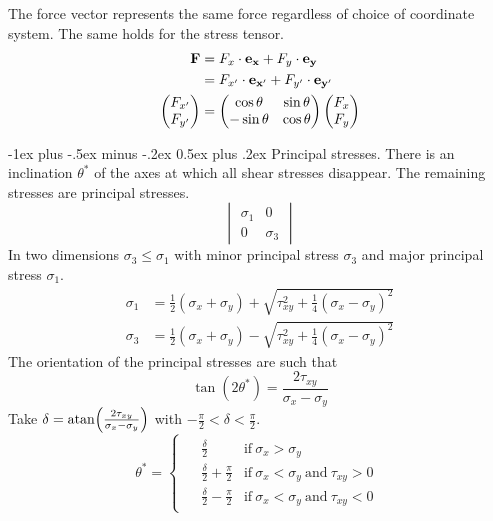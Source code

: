 \documentclass[10pt,landscape,a4paper]{article}
\makeatletter
\renewcommand{\section}{\@startsection{section}{1}{0mm}%
	{-1ex plus -.5ex minus -.2ex}%
	{0.5ex plus .2ex}%
	{\normalfont\large\bfseries}}
\makeatother
\begin{document}
\begin{multicols}{3}
\begin{figure}[H]
	\end{figure}
	The force vector represents the same force regardless of choice of coordinate system. The same holds for the stress tensor.
	\begin{align*}
		\vb{F}                                     & =F_x\cdot\vb{e}_{\vb{x}}+F_y\cdot\vb{e}_{\vb{y}}                                                                 \\
		                                           & =F_{x'}\cdot\vb{e}_{\vb{x'}}+F_{y'}\cdot\vb{e}_{\vb{y'}}                                                         \\
		\begin{pmatrix}F_{x'}\\F_{y'}\end{pmatrix} & =\begin{pmatrix}\cos\theta&\sin\theta \\ -\sin\theta&\cos\theta\end{pmatrix}\begin{pmatrix}F_x\\F_y\end{pmatrix}
	\end{align*}
	
	\section{Principal stresses.}
	There is an inclination $ \theta^\ast $ of the axes at which all shear stresses disappear.
	The remaining stresses are principal stresses.
	\[
		\begin{vmatrix}
			\sigma_1 & 0        \\
			0        & \sigma_3
		\end{vmatrix}
	\]
	In two dimensions $ \sigma_3\leq\sigma_1 $ with minor principal stress $ \sigma_3 $ and major principal stress $ \sigma_1 $.
	\begin{align*}
		\sigma_1 & =\frac{1}{2}(\sigma_x+\sigma_y)+\sqrt{\tau_{xy}^2+\frac{1}{4}(\sigma_x-\sigma_y)^2} \\
		\sigma_3 & =\frac{1}{2}(\sigma_x+\sigma_y)-\sqrt{\tau_{xy}^2+\frac{1}{4}(\sigma_x-\sigma_y)^2}
	\end{align*}
	The orientation of the principal stresses are such that
	\[
		\tan(2\theta^\ast)=\frac{2\tau_{xy}}{\sigma_x-\sigma_y}
	\]
	Take $ \delta=\atan(\frac{2\tau_{xy}}{\sigma_x-\sigma_y}) $ with $ -\frac{\pi}{2}<\delta<\frac{\pi}{2} $.
	\[\theta^\ast=
		\begin{cases*}
			\begin{aligned}
				 & \frac{\delta}{2}               & \text{if} \ \sigma_x>\sigma_y                            \\
				 & \frac{\delta}{2}+\frac{\pi}{2} & \text{if} \ \sigma_x<\sigma_y \ \text{and} \ \tau_{xy}>0 \\
				 & \frac{\delta}{2}-\frac{\pi}{2} & \text{if} \ \sigma_x<\sigma_y \ \text{and} \ \tau_{xy}<0
			\end{aligned}
		\end{cases*}
	\]
	

\end{multicols}
\end{document}
